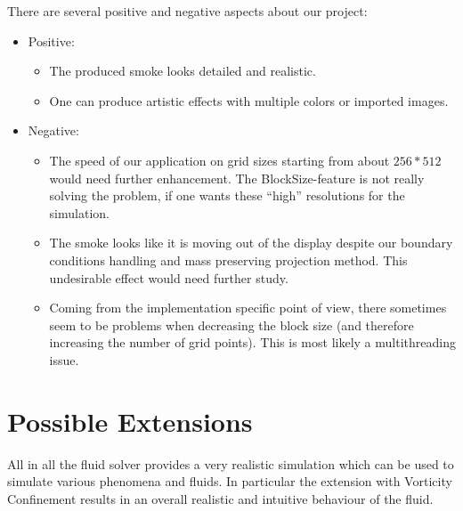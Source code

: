 \documentclass[a4paper,10pt,oneside,final,german,openbib,pdftex,titlepage]{scrbook}
\begin{document}
\begin{figure}[H]
{ \label{monroe}
}
\end{figure}
%
There are several positive and negative aspects about our project:
\begin{itemize}
\item Positive:
\begin{itemize}
\item The produced smoke looks detailed and realistic.
\item One can produce artistic effects with multiple colors or imported images.
\end{itemize}
\item Negative:
\begin{itemize}
\item The speed of our application on grid sizes starting from about $256*512$ would need further enhancement. The BlockSize-feature is not really solving the problem, if one wants these ``high'' resolutions for the simulation.
\item The smoke looks like it is moving out of the display despite our boundary conditions handling and mass preserving projection method. This undesirable effect would need further study.
\item Coming from the implementation specific point of view, there sometimes seem to be problems when decreasing the block size (and therefore increasing the number of grid points). This is most likely a multithreading issue.
\end{itemize}
\end{itemize}
%
\chapter{Possible Extensions}
All in all the fluid solver provides a very realistic simulation which can be used to simulate various phenomena and fluids. In particular the extension with Vorticity Confinement results in an overall realistic and intuitive behaviour of the fluid.\\
\end{document}

